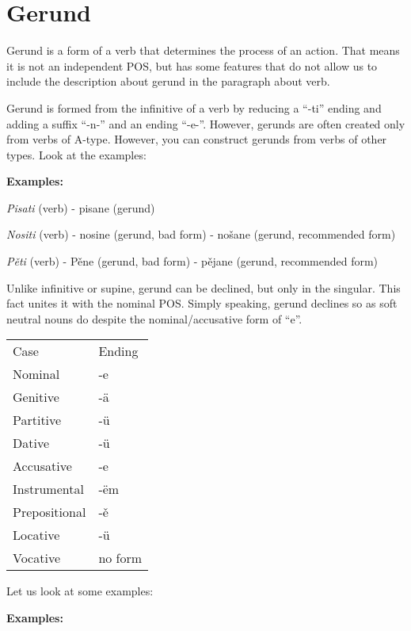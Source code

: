 \section{Gerund}

Gerund is a form of a verb that determines the process of an action. That means it is not an independent POS, but has some features that do not allow us to include the description about gerund in the paragraph about verb.

Gerund is formed from the infinitive of a verb by reducing a “-ti” ending and adding a suffix “-n-” and an ending “-e-”. However, gerunds are often created only from verbs of A-type. However, you can construct gerunds from verbs of other types. Look at the examples:

\textbf{Examples:}

\textit{Pisati} (verb) - pisane (gerund)

\textit{Nositi} (verb) - nosine (gerund, bad form) - nošane (gerund, recommended form)

\textit{Pěti} (verb) - Pěne (gerund, bad form) - pějane (gerund, recommended form)

Unlike infinitive or supine, gerund can be declined, but only in the singular. This fact unites it with the nominal POS. Simply speaking, gerund declines so as soft neutral nouns do despite the nominal/accusative form of “e”.

\begin{table}
	\begin{tabular}{ll}
	Case & Ending \\
	Nominal & -e \\
	Genitive & -ä \\
	Partitive & -ü \\
	Dative & -ü \\
	Accusative & -e \\
	Instrumental & -ëm \\
	Prepositional & -ě \\
	Locative & -ü \\
	Vocative & no form
	\end{tabular}
\end{table}

Let us look at some examples:

\textbf{Examples:}


